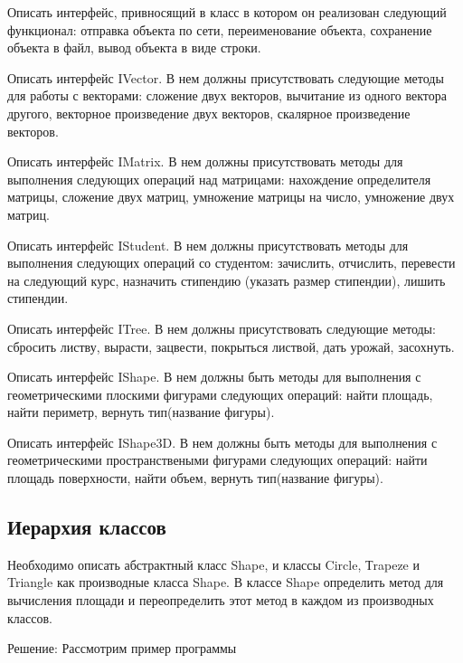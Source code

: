 \task Описать интерфейс, привносящий в класс в котором он реализован
следующий функционал: отправка объекта по сети, переименование
объекта, сохранение объекта в файл, вывод объекта в виде строки.

\task Описать интерфейс IVector. В нем должны присутствовать следующие
методы для работы с векторами: сложение двух векторов, вычитание из
одного вектора другого, векторное произведение двух векторов,
скалярное произведение векторов.

\task Описать интерфейс IMatrix. В нем должны присутствовать методы
для выполнения следующих операций над матрицами: нахождение
определителя матрицы, сложение двух матриц, умножение матрицы на
число, умножение двух матриц.

\task Описать интерфейс IStudent. В нем должны присутствовать методы
для выполнения следующих операций со студентом: зачислить, отчислить,
перевести на следующий курс, назначить стипендию (указать размер
стипендии), лишить стипендии.

\task Описать интерфейс ITree. В нем должны присутствовать следующие
методы: сбросить листву, вырасти, зацвести, покрыться листвой, дать
урожай, засохнуть.

\task Описать интерфейс IShape. В нем должны быть методы для
выполнения с геометрическими плоскими фигурами следующих операций:
найти площадь, найти периметр, вернуть тип(название фигуры).

\task Описать интерфейс IShape3D. В нем должны быть методы для
выполнения с геометрическими пространствеными фигурами следующих
операций: найти площадь поверхности, найти объем, вернуть тип(название
фигуры).

\subsection{Иерархия классов}

Необходимо описать абстрактный класс Shape, и классы Circle, Тrapeze
и Triangle как производные класса Shape. В классе Shape определить
метод для вычисления площади и переопределить этот метод в каждом из
производных классов.

Решение: Рассмотрим пример программы




